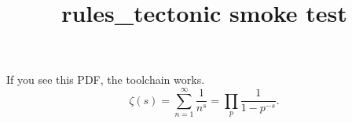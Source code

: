 \documentclass{article}
\title{rules\_tectonic smoke test}
\begin{document}
\maketitle
If you see this PDF, the toolchain works.
\begin{equation}
\zeta(s) = \sum_{n=1}^{\infty} \frac{1}{n^s} = \prod_p \frac{1}{1 - p^{-s}}.
\end{equation}
\end{document}
